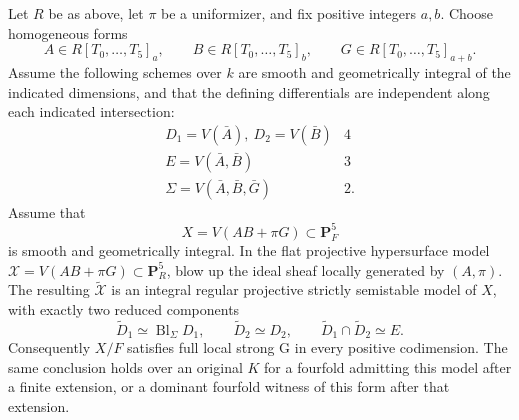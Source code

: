 \begin{proposition}
\label{r16tb:hypersurface-model}
Let $R$ be as above, let $\pi$ be a uniformizer, and fix positive
integers $a,b$. Choose homogeneous forms
\[
 A\in R[T_0,\ldots,T_5]_a,\qquad
 B\in R[T_0,\ldots,T_5]_b,\qquad
 G\in R[T_0,\ldots,T_5]_{a+b}.
\]
Assume the following schemes over $k$ are smooth and geometrically
integral of the indicated dimensions, and that the defining
differentials are independent along each indicated intersection:
\[
 \begin{array}{c|c}
 D_1=V(\bar A),\ D_2=V(\bar B)&4\\
 E=V(\bar A,\bar B)&3\\
 \Sigma=V(\bar A,\bar B,\bar G)&2.
 \end{array}
 \tag{TB16.7}\label{r16tb:transverse-data}
\]
Assume that
\[
 X=V(AB+\pi G)\subset\mathbf P^5_F
 \tag{TB16.8}\label{r16tb:hypersurface}
\]
is smooth and geometrically integral. In the flat projective
hypersurface model $\mathcal X=V(AB+\pi G)\subset\mathbf P^5_R$,
blow up the ideal sheaf locally generated by $(A,\pi)$.
The resulting $\widetilde{\mathcal X}$ is an integral regular
projective strictly semistable model of $X$, with exactly two
reduced components
\[
       \widetilde D_1\simeq\operatorname{Bl}_{\Sigma}D_1,
       \qquad \widetilde D_2\simeq D_2,
       \qquad \widetilde D_1\cap\widetilde D_2\simeq E.
 \tag{TB16.9}\label{r16tb:resolved-fiber}
\]
Consequently $X/F$ satisfies full local strong G in every
positive codimension. The same conclusion holds over an original
$K$ for a fourfold admitting this model after a finite extension,
or a dominant fourfold witness of this form after that extension.
\end{proposition}

